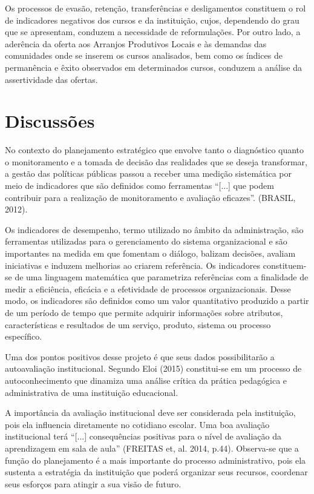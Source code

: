 \documentclass[article,12pt,onesidea,4paper,english,brazil]{abntex2}
\begin{document}
	Os processos de evasão, retenção, transferências e desligamentos constituem o rol de
	indicadores negativos dos cursos e da instituição, cujos, dependendo do grau que se apresentam,
	conduzem a necessidade de reformulações. Por outro lado, a aderência da oferta aos Arranjos
	Produtivos Locais e às demandas das comunidades onde se inserem os cursos analisados, bem
	como os índices de permanência e êxito observados em determinados cursos, conduzem a análise
	da assertividade das ofertas.
	
	\section*{Discussões}
	No contexto do planejamento estratégico que envolve tanto o diagnóstico quanto o
	monitoramento e a tomada de decisão das realidades que se deseja transformar, a gestão das
	políticas públicas passou a receber uma medição sistemática por meio de indicadores que são
	definidos como ferramentas “[...] que podem contribuir para a realização de monitoramento e
	avaliação eficazes”. (BRASIL, 2012).
	
	Os indicadores de desempenho, termo utilizado no âmbito da administração, são
	ferramentas utilizadas para o gerenciamento do sistema organizacional e são importantes na
	medida em que fomentam o diálogo, balizam decisões, avaliam iniciativas e induzem melhorias
	ao criarem referência. Os indicadores constituem-se de uma linguagem matemática que
	parametriza referências com a finalidade de medir a eficiência, eficácia e a efetividade de
	processos organizacionais. Desse modo, os indicadores são definidos como um valor quantitativo
	produzido a partir de um período de tempo que permite adquirir informações sobre atributos,
	características e resultados de um serviço, produto, sistema ou processo específico.
	
	Uma dos pontos positivos desse projeto é que seus dados possibilitarão a autoavaliação institucional. Segundo Eloi (2015) constitui-se em um processo de autoconhecimento que
	dinamiza uma análise crítica da prática pedagógica e administrativa de uma instituição
	educacional.
	
	A importância da avaliação institucional deve ser considerada pela instituição, pois ela
	influencia diretamente no cotidiano escolar. Uma boa avaliação institucional terá “[...]
	consequências positivas para o nível de avaliação da aprendizagem em sala de aula” (FREITAS
	et, al. 2014, p.44). Observa-se que a função do planejamento é a mais importante do processo
	administrativo, pois ela sustenta a estratégia da instituição que poderá organizar seus recursos,
	coordenar seus esforços para atingir a sua visão de futuro.
	
\end{document}
